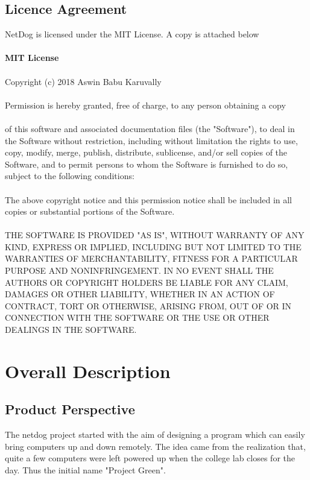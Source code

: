 \documentclass{scrreprt}
\begin{document}
\section{Licence Agreement}
NetDog is licensed under the MIT License. A copy is attached below\\\\
\textbf{MIT License}\\\\
Copyright (c) 2018 Aswin Babu Karuvally\\\\
Permission is hereby granted, free of charge, to any person obtaining a copy\\\\
of this software and associated documentation files (the "Software"), to deal
in the Software without restriction, including without limitation the rights
to use, copy, modify, merge, publish, distribute, sublicense, and/or sell
copies of the Software, and to permit persons to whom the Software is
furnished to do so, subject to the following conditions:\\\\
The above copyright notice and this permission notice shall be included in all
copies or substantial portions of the Software.\\\\
THE SOFTWARE IS PROVIDED "AS IS", WITHOUT WARRANTY OF ANY KIND, EXPRESS OR
IMPLIED, INCLUDING BUT NOT LIMITED TO THE WARRANTIES OF MERCHANTABILITY,
FITNESS FOR A PARTICULAR PURPOSE AND NONINFRINGEMENT. IN NO EVENT SHALL THE 
AUTHORS OR COPYRIGHT HOLDERS BE LIABLE FOR ANY CLAIM, DAMAGES OR OTHER
LIABILITY, WHETHER IN AN ACTION OF CONTRACT, TORT OR OTHERWISE, ARISING FROM,
OUT OF OR IN CONNECTION WITH THE SOFTWARE OR THE USE OR OTHER DEALINGS IN THE 
SOFTWARE.

\chapter{Overall Description}

\section{Product Perspective}
The netdog project started with the aim of designing a program which can easily
bring computers up and down remotely. The idea came from the realization that,
quite a few computers were left powered up when the college lab closes for the
day. Thus the initial name "Project Green".\\
\end{document}
